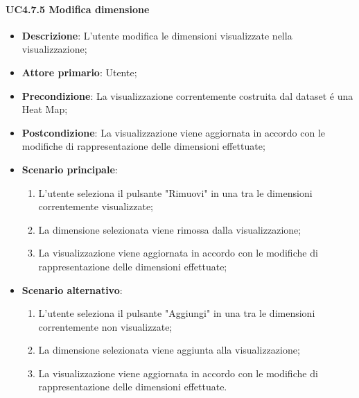 \paragraph{UC4.7.5 Modifica dimensione}
\label{par:uc4.7.5}
\begin{itemize}
    \item \textbf{Descrizione}:     L'utente modifica le dimensioni visualizzate nella visualizzazione;
    \item \textbf{Attore primario}: Utente;

    \item \textbf{Precondizione}:   La visualizzazione correntemente costruita dal dataset é una Heat Map;
    \item \textbf{Postcondizione}:  La visualizzazione viene aggiornata in accordo con le modifiche di rappresentazione delle dimensioni effettuate;
    \item \textbf{Scenario principale}:
    \begin{enumerate}
        \item L'utente seleziona il pulsante "Rimuovi" in una tra le dimensioni correntemente visualizzate;
        \item La dimensione selezionata viene rimossa dalla visualizzazione;
        \item La visualizzazione viene aggiornata in accordo con le modifiche di rappresentazione  delle dimensioni effettuate;
    \end{enumerate}
    \item \textbf{Scenario alternativo}: 
    \begin{enumerate}
        \item L'utente seleziona il pulsante "Aggiungi" in una tra le dimensioni correntemente non visualizzate;
        \item La dimensione selezionata viene aggiunta alla visualizzazione;
        \item La visualizzazione viene aggiornata in accordo con le modifiche di rappresentazione  delle dimensioni effettuate.
    \end{enumerate}
\end{itemize}

